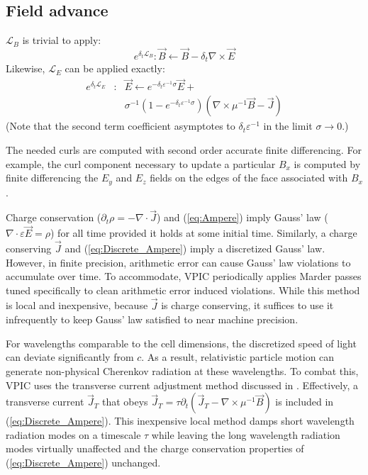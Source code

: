 \documentclass[aps,prl,preprint,preprintnumbers,groupedaddress]{revtex4}
\newcommand{\eps}{\varepsilon}
\newcommand{\vecJ}{\vec{J}}
\newcommand{\vecE}{\vec{E}}
\newcommand{\vecB}{\vec{B}}
\newcommand{\op}{\mathcal{L}}
\newcommand{\PDeriv}[2]{\partial_{#2}#1}
\newcommand{\Div}[1]{\nabla \cdot #1}
\newcommand{\Curl}[1]{\nabla \times #1}
\newcommand{\eq}[1]{(\ref{eq:#1})}
\begin{document}
\subsection{Field advance}

$\op_B$ is trivial to apply:
\begin{equation}
e^{\delta_t \op_B}: \vecB \leftarrow \vecB - \delta_t \Curl{\vecE}
\label{eq:Discrete_Faraday}
\end{equation}
Likewise, $\op_E$ can be applied exactly:
\begin{eqnarray}
e^{\delta_t \op_E}&:& \vecE \leftarrow e^{-\delta_t \eps^{-1} \sigma} \vecE + \nonumber\\
& & \sigma^{-1}\left( 1 - e^{-\delta_t \eps^{-1} \sigma} \right) \left( \Curl{\mu^{-1}\vecB} - \vecJ \right)
\label{eq:Discrete_Ampere}
\end{eqnarray}
(Note that the second term coefficient asymptotes to
$\delta_t \eps^{-1}$ in the limit $\sigma \rightarrow 0$.)

The needed curls are computed with second order accurate finite
differencing.  For example, the curl component necessary to update a
particular $B_x$ is computed by finite differencing the $E_y$ and
$E_z$ fields on the edges of the face associated with $B_x$.

Charge conservation ($\PDeriv{\rho}{t} = -\Div{\vecJ}$) and
\eq{Ampere} imply Gauss' law ($\Div{\eps\vecE} = \rho$) for all
time provided it holds at some initial time.  Similarly, a charge
conserving $\vecJ$ and \eq{Discrete_Ampere} imply a discretized Gauss'
law.  However, in finite precision, arithmetic error can cause Gauss'
law violations to accumulate over time.  To accommodate, VPIC
periodically applies Marder passes \cite{Marder_1987} tuned
specifically to clean arithmetic error induced violations.  While this
method is local and inexpensive, because $\vecJ$ is charge conserving,
it suffices to use it infrequently to keep Gauss' law satisfied to
near machine precision.

For wavelengths comparable to the cell dimensions, the discretized
speed of light can deviate significantly from $c$.  As a result,
relativistic particle motion can generate non-physical Cherenkov
radiation at these wavelengths.  To combat this, VPIC uses the
transverse current adjustment method discussed in
\cite{Eastwood_et_al_1995}.  Effectively, a transverse current
$\vecJ_T$ that obeys $\vecJ_T = \tau \PDeriv{\left(\vecJ_T -
\Curl{\mu^{-1}\vecB}\right)}{t}$ is included in \eq{Discrete_Ampere}.
This inexpensive local method damps short wavelength radiation modes
on a timescale $\tau$ while leaving the long wavelength radiation
modes virtually unaffected and the charge conservation properties of
\eq{Discrete_Ampere} unchanged.
\end{document}
